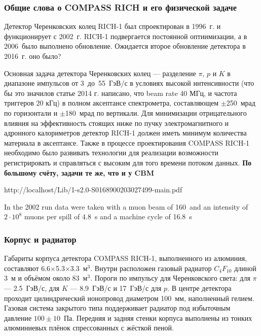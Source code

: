 

\subsubsection{Общие слова о COMPASS RICH и его физической задаче}

Детектор Черенковских колец \mbox{RICH-1} был спроектирован в 1996~г. и функционирует с 2002~г. \mbox{RICH-1} подвергается постоянной оптиимизации, а в 2006~было выполнено обновление. Ожидается второе обновление детектора в 2016~г. \todo оно было?

Основная задача детектора Черенковских колец --- разделение $\pi$, $p$ и $K$ в диапазоне импульсов от 3~до~55~ГэВ/с в условиях высокой интенсивности (что бы это значило\todo в статье 2014 г. написано, что beam rate 40 МГц, и частота триггеров 20 кГц) в полном аксептансе спектрометра, составляющем $\pm$250~мрад по горизонтали и $\pm$180~мрад по вертикали. Для минимизации отрицательного влияния на эффективность стоящих ниже по пучку электромагнитного и адронного калориметров детектор \mbox{RICH-1} должен иметь минимум количества материала в аксептансе. Также в процессе проектирования COMPASS \mbox{RICH-1} необходимо было развивать технологии для реализации возможности регистрировать и справляться с высоким для того времени потоком данных.
\todo \textbf{По большому счёту, задачи те же, что и у CBM}

http://localhost/Lib/1-s2.0-S0168900203027499-main.pdf

In the 2002 run data were taken with a muon beam of 160~\GeVoverC and an intensity of $2 \cdot 10^{8}$ muons per spill of 4.8~s and a machine cycle of 16.8~s

\subsubsection{Корпус и радиатор}

Габариты корпуса детектора COMPASS \mbox{RICH-1}, выполненного из алюминия, составляют 6.6$\times$5.3$\times$3.3~м$^3$. Внутри расположен газовый радиатор $C_{4}F_{10}$ длиной 3~м и объёмом около 83~м$^3$. Пороги по импульсу для Черенковского света: для $\pi$ --- 2.5~ГэВ/с, для $K$ --- 8.9~ГэВ/с и 17~ГэВ/с для $p$. В центре детектора проходит цилиндрический ионопровод диаметром 100~мм, наполненный гелием.
Газовая система закрытого типа поддерживает радиатор под избыточным давление $100\pm10$~Па.
Передняя и задняя стенки корпуса выполнены из тонких алюминиевых плёнок спрессованных с жёсткой пеной. \todo

